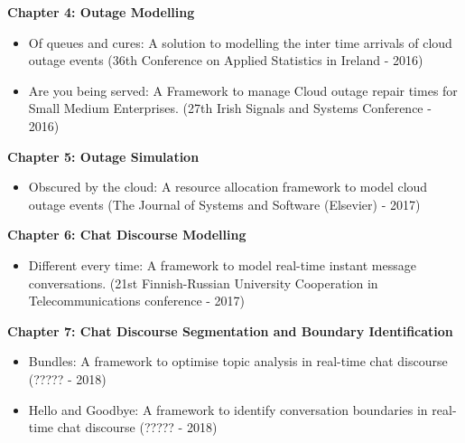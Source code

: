 \textbf{Chapter 4: Outage Modelling}

\begin{itemize}
  \item Of queues and cures: A solution to modelling the inter time arrivals of cloud outage events (36th Conference on Applied Statistics in Ireland - 2016)
  \item Are you being served: A Framework to manage Cloud outage repair times for Small Medium Enterprises. (27th Irish Signals and Systems Conference - 2016)
\end{itemize}


\textbf{Chapter 5: Outage Simulation}

\begin{itemize}
  \item Obscured by the cloud: A resource allocation framework to model cloud outage events (The Journal of Systems and Software (Elsevier) - 2017)
\end{itemize}


\textbf{Chapter 6: Chat Discourse Modelling}

\begin{itemize}
  \item Different every time: A framework to model real-time instant message conversations. (21st Finnish-Russian University Cooperation in Telecommunications conference - 2017)
\end{itemize}


\textbf{Chapter 7: Chat Discourse Segmentation and Boundary Identification}

\begin{itemize}
  \item Bundles: A framework to optimise topic analysis in real-time chat discourse (????? - 2018)
  \item Hello and Goodbye: A framework to identify conversation boundaries in real-time chat discourse (????? - 2018)
\end{itemize}
